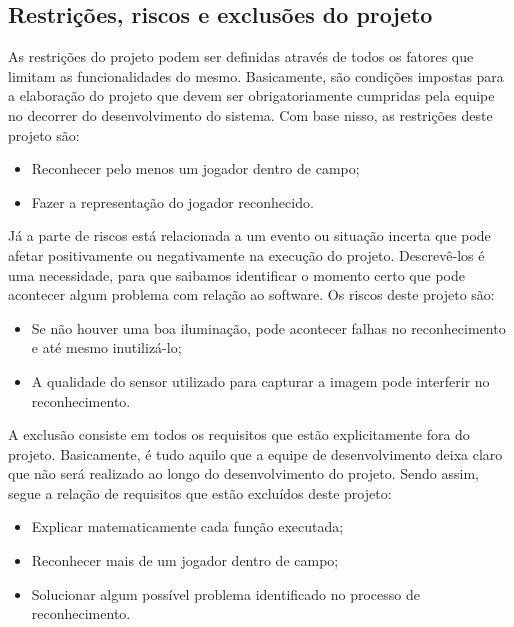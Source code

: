 \subsection{Restrições, riscos e exclusões do projeto}

As restrições do projeto podem ser definidas através de todos os fatores que limitam as funcionalidades do mesmo. Basicamente, são condições impostas para a elaboração do projeto que devem ser obrigatoriamente cumpridas pela equipe no decorrer do desenvolvimento do sistema. Com base nisso, as restrições deste projeto são:

\begin{itemize}
\raggedright \item Reconhecer pelo menos um jogador dentro de campo;
\raggedright \item Fazer a representação do jogador reconhecido.
\end{itemize}

Já a parte de riscos está relacionada a um evento ou situação incerta que pode afetar positivamente ou negativamente na execução do projeto. Descrevê-los é uma necessidade, para que saibamos identificar o momento certo que pode acontecer algum problema com relação ao software. Os riscos deste projeto são:

\begin{itemize}
\raggedright \item Se não houver uma boa iluminação, pode acontecer falhas no reconhecimento e até mesmo inutilizá-lo;
\raggedright \item A qualidade do sensor utilizado para capturar a imagem pode interferir no reconhecimento.
\end{itemize}

A exclusão consiste em todos os requisitos que estão explicitamente fora do projeto. Basicamente, é tudo aquilo que a equipe de desenvolvimento deixa claro que não será realizado ao longo do desenvolvimento do projeto. Sendo assim, segue a relação de requisitos que estão excluídos deste projeto:

\begin{itemize}
\raggedright \item Explicar matematicamente cada função executada;

\raggedright \item Reconhecer mais de um jogador dentro de campo;

\raggedright \item Solucionar algum possível problema identificado no processo de reconhecimento.
\end{itemize}